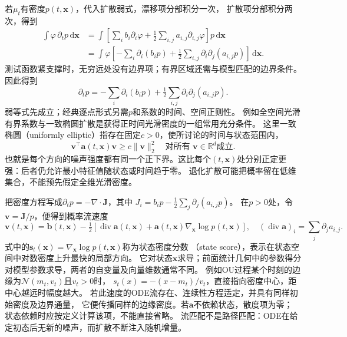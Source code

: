 若$\mu_t$有密度$p(t,\bm x)$，代入扩散弱式，漂移项分部积分一次，
扩散项分部积分两次，得到
\begin{align*}
 \int\varphi\,\partial_t p\,\mathrm d\bm x
  &=\int\left[\sum_i b_i\partial_i\varphi
            +\tfrac12\sum_{i,j}a_{i,j}\partial_{i,j}\varphi\right]p\,\mathrm d\bm x\\
  &=\int\varphi\left[-\sum_i\partial_i(b_ip)
           +\tfrac12\sum_{i,j}\partial_i\partial_j(a_{i,j}p)\right]\,\mathrm d\bm x .
\end{align*}
测试函数紧支撑时，无穷远处没有边界项；有界区域还需与模型匹配的边界条件。
因此得到
\begin{equation}
 \partial_t p=-\sum_i\partial_i(b_ip)
                  +\tfrac12\sum_{i,j}\partial_i\partial_j(a_{i,j}p).
 \label{eq:dynamical-fokker-planck}
\end{equation}
弱等式先成立；经典逐点形式另需$p$和系数的时间、空间正则性。
例如全空间光滑有界系数与一致椭圆扩散是获得正时间光滑密度的一组常用充分条件。
这里一致椭圆（uniformly elliptic）指存在固定$c>0$，使所讨论的时间与状态范围内，
\[
 \bm v^\top\bm a(t,\bm x)\bm v\geq c\|\bm v\|_2^2
 \quad\text{对所有 }\bm v\in\mathbb R^d\text{成立}.
\]
也就是每个方向的噪声强度都有同一个正下界。这比每个$(t,\bm x)$处分别正定更强：后者仍允许最小特征值随状态或时间趋于零。
退化扩散可能把概率留在低维集合，不能预先假定全维光滑密度。

把密度方程写成$\partial_t p=-\nabla\cdot\bm J$，其中
$J_i=b_ip-\frac12\sum_j\partial_j(a_{i,j}p)$。
在$p>0$处，令$\bm v=\bm J/p$，便得到概率流速度
\begin{equation}
 \bm v(t,\bm x)=\bm b(t,\bm x)
   -\tfrac12[\operatorname{div}\bm a(t,\bm x)
                         +\bm a(t,\bm x)\nabla_{\bm x}\log p(t,\bm x)],
 \quad
 (\operatorname{div}\bm a)_i=\sum_j\partial_j a_{i,j}.
 \label{eq:action-state-probability-flow}
\end{equation}
式中的$\bm s_t(\bm x)=\nabla_{\bm x}\log p(t,\bm x)$称为状态密度分数
（state score），表示在状态空间中对数密度上升最快的局部方向。
它对状态$\bm x$求导；前面统计几何中的参数得分对模型参数求导，两者的自变量及向量维数通常不同。
例如OU过程某个时刻的边缘为$\mathcal N(m_t,v_t)$且$v_t>0$时，
$s_t(x)=-(x-m_t)/v_t$，直接指向密度中心，距中心越远时幅度越大。
若此速度的ODE流存在、连续性方程适定，并具有同样初始密度及边界通量，
它便传播同样的边缘密度。若$\bm a$不依赖状态，散度项为零；
状态依赖时应按定义计算该项，不能直接省略。
流匹配不是路径匹配：ODE在给定初态后无新的噪声，而扩散不断注入随机增量。

